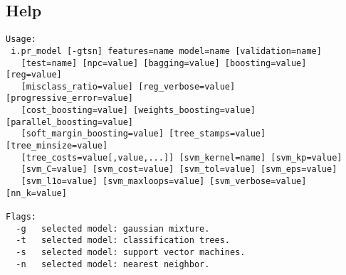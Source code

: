 \subsection*{Help}
\begin{verbatim}
Usage:
 i.pr_model [-gtsn] features=name model=name [validation=name]
   [test=name] [npc=value] [bagging=value] [boosting=value] [reg=value]
   [misclass_ratio=value] [reg_verbose=value] [progressive_error=value]
   [cost_boosting=value] [weights_boosting=value] [parallel_boosting=value]
   [soft_margin_boosting=value] [tree_stamps=value] [tree_minsize=value]
   [tree_costs=value[,value,...]] [svm_kernel=name] [svm_kp=value]
   [svm_C=value] [svm_cost=value] [svm_tol=value] [svm_eps=value]
   [svm_l1o=value] [svm_maxloops=value] [svm_verbose=value] [nn_k=value]

Flags:
  -g   selected model: gaussian mixture.
  -t   selected model: classification trees.
  -s   selected model: support vector machines.
  -n   selected model: nearest neighbor.


\end{verbatim}
